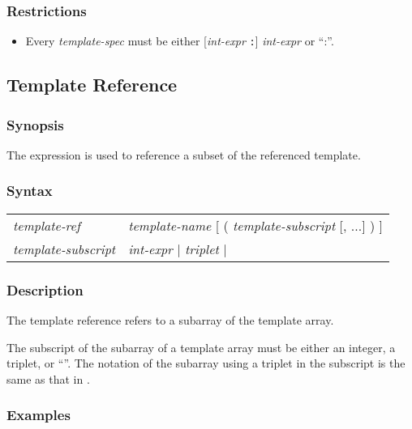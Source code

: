 \subsubsection*{Restrictions}

\begin{itemize}
\item Every {\it template-spec} must be either [{\it int-expr} {\tt :}] {\it
  int-expr} or ``:''.
\end{itemize}

\subsection{Template Reference}

\subsubsection*{Synopsis}

The  expression is used to reference a subset of
the referenced template.

\subsubsection*{Syntax}

\begin{center}
\begin{tabular}{ll}
{\it template-ref} & {\it template-name} [ ( {\it template-subscript}
[,  ...] ) ] \\
{\it template-subscript} & {\it int-expr} $\vert$ {\it triplet} $\vert$
     {\tt *} \\
\end{tabular}
\end{center}

\subsubsection*{Description}

The template reference refers to a subarray of the template array.  

The subscript
of the subarray of a template array must be either an integer, a
triplet, or ``{\tt *}''. The notation of the subarray using a triplet in
the subscript is the same as that in {\Fort}. 

\subsubsection*{Examples}

